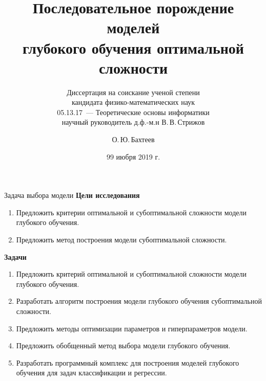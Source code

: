 \documentclass[11pt,pdf,utf8,russian,aspectratio=169]{beamer}
\title[Последовательное порождение моделей]{Последовательное порождение моделей \\глубокого обучения оптимальной сложности}
\subtitle
{\small Диссертация на соискание ученой степени \\
кандидата физико-математических наук \\
05.13.17~--- Теоретические основы информатики\\
научный руководитель д.ф.-м.н В.\,В.\,Стрижов}
\author{О.\,Ю.\,Бахтеев}
\institute[МФТИ]{Московский Физико-Технический Институт (Государственный Университет)}
\date[99.99.2019]{99 июбря 2019 г.}
\begin{document}
\begin{frame}
  \titlepage
\end{frame}

\begin{frame}{Задача выбора модели}
\textbf{Цели исследования}\\
\begin{enumerate}
\item Предложить критерии оптимальной и субоптимальной сложности модели глубокого обучения.
\item Предложить метод построения модели субоптимальной сложности.
\end{enumerate}
\textbf{Задачи}\\
\begin{enumerate}
\item Предложить критерий оптимальной и субоптимальной сложности модели глубокого обучения.
\item Разработать алгоритм построения модели глубокого обучения субоптимальной сложности.
\item Предложить методы оптимизации параметров и гиперпараметров модели.
\item Предложить обобщенный метод выбора модели глубокого обучения.
\item Разработать программный комплекс для построения моделей глубокого обучения для задач классификации и регрессии.
\end{enumerate}
\end{frame}
\end{document}
